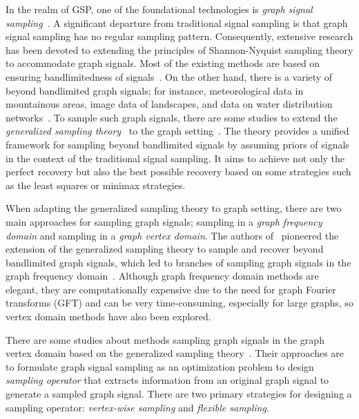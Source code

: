 \documentclass[journal]{IEEEtran}
\begin{document}
In the realm of GSP, one of the foundational technologies is \textit{graph signal sampling}~\cite{chen2015discrete, tanaka2020sampling}.
A significant departure from traditional signal sampling is that graph signal sampling has no regular sampling pattern. 
Consequently, extensive research has been devoted to extending the principles of Shannon-Nyquist sampling theory to accommodate graph signals.
Most of the existing methods are based on ensuring bandlimitedness of signals~\cite{chen2015discrete, marques2015sampling, anis2016efficient, tsitsvero2016signals, valsesia2018sampling, tanaka2018spectral, puy2018random, sakiyama2019eigendecomposition, bai2020fast, jayawant2022practical}.
On the other hand, there is a variety of beyond bandlimited graph signals; for instance, meteorological data in mountainous areas, image data of landscapes, and data on water distribution networks~\cite{dong2016learning,cheung2018graph,li2025sensor}.
To sample such graph signals, there are some studies to extend the \textit{generalized sampling theory}~\cite{elder2009beyond, eldar2015sampling} to the graph setting~\cite{chepuri2018graphsamp, tanaka2018spectral, tanaka2020sampling, tanaka2020gensamp,hara2020generalized, hara2021design, hara2022gsss, hara2023graph}.
The theory provides a unified framework for sampling beyond bandlimited signals by assuming priors of signals in the context of the traditional signal sampling.
It aims to achieve not only the perfect recovery but also the best possible recovery based on some strategies such as the least squares or minimax strategies. 

When adapting the generalized sampling theory to graph setting, there are two main approaches for sampling graph signals; sampling in a \textit{graph frequency domain} and sampling in a \textit{graph vertex domain}.
The authors of~\cite{chepuri2018graphsamp} pioneered the extension of the generalized sampling theory to sample and recover beyond bandlimited graph signals, which led to branches of sampling graph signals in the graph frequency domain~\cite{tanaka2020sampling,hara2023graph}. 
Although graph frequency domain methods are elegant, they are computationally expensive due to the need for graph Fourier transforms (GFT) and can be very time-consuming, especially for large graphs, so vertex domain methods have also been explored.

There are some studies about methods sampling graph signals in the graph vertex domain based on the generalized sampling theory~\cite{hara2021design,hara2022gsss}.
Their approaches are to formulate graph signal sampling as an optimization problem to design \textit{sampling operator} that extracts information from an original graph signal to generate a sampled graph signal.
There are two primary strategies for designing a sampling operator: \textit{vertex-wise sampling} and \textit{flexible sampling}.
\end{document}
